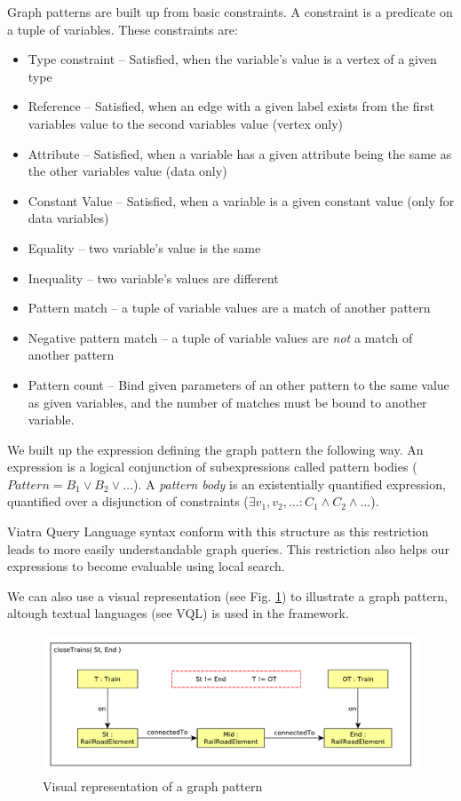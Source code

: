 Graph patterns are built up from basic constraints. 
A constraint is a predicate on a tuple of variables. 
These constraints are: 

\begin{itemize}
	\item Type constraint -- Satisfied, when the variable's value is a vertex of a given type
	\item Reference -- Satisfied, when an edge with a given label exists from the first variables value to the second variables value (vertex only)
	\item Attribute -- Satisfied, when a variable has a given attribute being the same as the other variables value (data only)
	\item Constant Value -- Satisfied, when a variable is a given constant value (only for data variables)
	\item Equality -- two variable's value is the same
	\item Inequality -- two variable's values are different
	\item Pattern match -- a tuple of variable values are a match of another pattern	
	\item Negative pattern match -- a tuple of variable values are \emph{not} a match of another pattern
	\item Pattern count -- Bind given parameters of an other pattern to the same value as given variables, and the number of matches must be bound to another variable.
\end{itemize}


We built up the expression defining the graph pattern the following way. 
An expression is a logical conjunction of subexpressions called pattern bodies ($Pattern = B_1 \vee B_2 \vee \dots$). 
A \emph{pattern body} is an existentially quantified expression, quantified over a disjunction of constraints ($\exists{} v_1, v_2, \dots : C_1 \wedge{} C_2 \wedge \dots$).

Viatra Query Language syntax conform with this structure as this restriction leads to more easily understandable graph queries.
This restriction also helps our expressions to become evaluable using local search.

We can also use a visual representation (see Fig. \ref{fig:pattern-visual}) to illustrate a graph pattern, altough textual languages (see VQL) is used in the framework.

\begin{figure}[h]
	\begin{center}
		\includegraphics[width=\textwidth]{figures/closeTrains-pattern.pdf}
		\caption{Visual representation of a graph pattern}
		\label{fig:pattern-visual}
	\end{center}
\end{figure}


